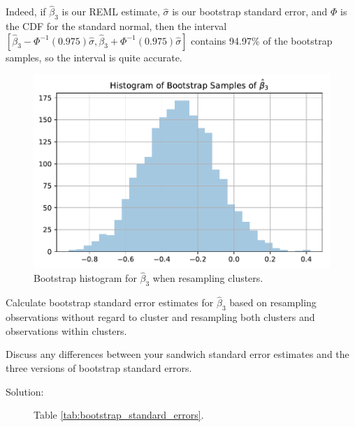 \documentclass[11pt, letterpaper]{article}
\begin{document}
\begin{enumerate}[(a)]
\begin{description}
  Indeed, if $\hat{\beta}_3$ is our REML estimate, $\hat{\sigma}$ is our
  bootstrap standard error, and $\Phi$ is the CDF for the standard normal, then
  the interval
  $\left[\hat{\beta}_3 - \Phi^{-1}\left(0.975\right)\hat{\sigma}, \hat{\beta}_3
    + \Phi^{-1}\left(0.975\right)\hat{\sigma}\right]$ contains 94.97\% of the
  bootstrap samples, so the interval is quite accurate.
\end{description}

\begin{figure}
  \centering
  \includegraphics{hist_bootstrap_cluster.pdf}
  \caption{Bootstrap histogram for $\hat\beta_3$ when resampling clusters.}
  \label{fig:hist_bootstrap_cluster}
\end{figure}

{\em \item Calculate bootstrap standard error estimates for $\hat{\beta}_3$ based on resampling observations  
  without regard to cluster and resampling both clusters and observations within clusters. }

\begin{table}
  \centering
  
  \caption{Standard errors calculated with the bootstrap with various sampling
    strategies. 2,048 samples were collected each time.}
  \label{tab:bootstrap_standard_errors}
\end{table}
{\em \item Discuss any differences between your sandwich standard error estimates and the three versions of bootstrap standard errors.}

\begin{description}
\item[Solution:] Table \ref{tab:bootstrap_standard_errors}.
\end{description}
\end{enumerate} 
\end{document}
